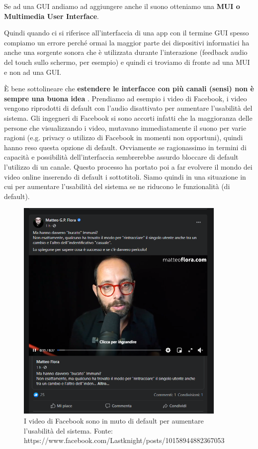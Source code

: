 Se ad una GUI andiamo ad aggiungere anche il suono otteniamo una \textbf{MUI o Multimedia User Interface}.

Quindi quando ci si riferisce all'interfaccia di una app con il termine GUI spesso compiamo un errore perché ormai la maggior parte dei dispositivi informatici ha anche una sorgente sonora che è utilizzata durante l'interazione (feedback audio del touch sullo schermo, per esempio) e quindi ci troviamo di fronte ad una MUI e non ad una GUI.


È bene sottolineare che \textbf{estendere le interfacce con più canali (sensi) non è sempre una buona idea
}. Prendiamo ad esempio i video di Facebook, i video vengono riprodotti di default con l'audio disattivato per aumentare l'usabilità del sistema. Gli ingegneri di Facebook si sono accorti infatti che la maggioranza delle persone che visualizzando i video, mutavano immediatamente il suono per varie ragioni (e.g. privacy o utilizzo di Facebook in momenti non opportuni), quindi hanno reso questa opzione di default. Ovviamente se ragionassimo in termini di capacità e possibilità dell'interfaccia sembrerebbe assurdo bloccare di default l'utilizzo di un canale.
Questo processo ha portato poi a far evolvere il mondo dei video online inserendo di default i sottotitoli. Siamo quindi in una situazione in cui per aumentare l'usabilità del sistema se ne riducono le funzionalità (di default).


\begin{figure}[!h]
	\centering
	\includegraphics[width=0.9\textwidth]{immagini/flora_video.png}
	\caption{I video di Facebook sono in muto di default per aumentare l'usabilità del sistema. Fonte: 
https://www.facebook.com/Lastknight/posts/10158944882367053}
\end{figure}



